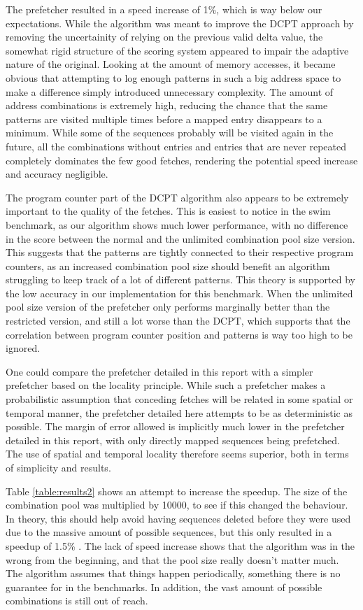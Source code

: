 The prefetcher resulted in a speed increase of 1\%, which is way below our expectations. While the algorithm was meant to improve the DCPT approach by removing the uncertainity of relying on the previous valid delta value, the somewhat rigid structure of the scoring system appeared to impair the adaptive nature of the original. Looking at the amount of memory accesses, it became obvious that attempting to log enough patterns in such a big address space to make a difference simply introduced unnecessary complexity. The amount of address combinations is extremely high, reducing the chance that the same patterns are visited multiple times before a mapped entry disappears to a minimum. While some of the sequences probably will be visited again in the future, all the combinations without entries and entries that are never repeated completely dominates the few good fetches, rendering the potential speed increase and accuracy negligible. 

The program counter part of the DCPT algorithm also appears to be extremely important to the quality of the fetches. This is easiest to notice in the swim benchmark, as our algorithm shows much lower performance, with no difference in the score between the normal and the unlimited combination pool size version. This suggests that the patterns are tightly connected to their respective program counters, as an increased combination pool size should benefit an algorithm struggling to keep track of a lot of different patterns. This theory is supported by the low accuracy in our implementation for this benchmark. When the unlimited pool size version of the prefetcher only performs marginally better than the restricted version, and still a lot worse than the DCPT, which supports that the correlation between program counter position and patterns is way too high to be ignored. 

One could compare the prefetcher detailed in this report with a simpler prefetcher based on the locality principle. While such a prefetcher makes a probabilistic assumption that conceding fetches will be related in some spatial or temporal manner, the prefetcher detailed here attempts to be as deterministic as possible. The margin of error allowed is implicitly much lower in the prefetcher detailed in this report, with only directly mapped sequences being prefetched. The use of spatial and temporal locality therefore seems superior, both in terms of simplicity and results.

Table \ref{table:results2} shows an attempt to increase the speedup. The size of the combination pool was multiplied by 10000, to see if this changed the behaviour. In theory, this should help avoid having sequences deleted before they were used due to the massive amount of possible sequences, but this only resulted in a speedup of 1.5\% . The lack of speed increase shows that the algorithm was in the wrong from the beginning, and that the pool size really doesn't matter much. The algorithm assumes that things happen periodically, something there is no guarantee for in the benchmarks. In addition, the vast amount of possible combinations is still out of reach.

